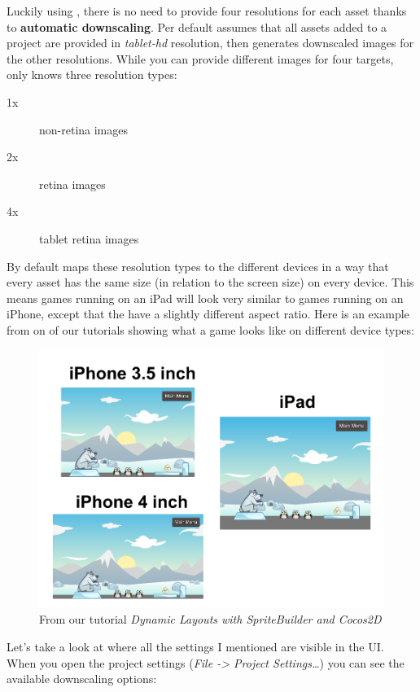 Luckily using \SB{}, there is no need to provide four resolutions for each asset
thanks to \textbf{automatic downscaling}.
Per default \SB{} assumes that all assets added to a project are provided in \textit{tablet-hd} resolution, then
\SB{} generates downscaled images for the other resolutions. While you can
provide different images for four targets, \SB{} only knows three resolution
types:
\begin{description}
\item[1x] non-retina images
\item[2x] retina images
\item[4x] tablet retina images
\end{description}

By default \SB{} maps these resolution types to the different devices in a way
that every asset has the same size (in relation to the screen size) on every
device. This means games running on an iPad will look very similar to games
running on an iPhone, except that the have a slightly different aspect ratio.
Here is an example from on of our tutorials showing what a game looks like on
different device types:

\begin{figure}[H]
		\centering
		\includegraphics[width=0.9\linewidth]{images/Chapter2/ResultsFlexibleScaleMode.png}
		\caption{From our tutorial \textit{Dynamic Layouts with SpriteBuilder and
		Cocos2D}}
\end{figure}

Let's take a look at where all the settings I mentioned are visible in the \SB{}
UI. When you open the project settings (\textit{File -> Project Settings\ldots})
you can see the available downscaling options:

